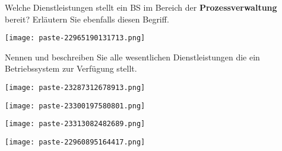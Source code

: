 \documentclass{article}
\begin{document}
\begin{tcolorbox}[colback=white!10!white,colframe=lightgray!75!black,
  savelowerto=\jobname_ex.tex,breakable,enhanced,lines before break=40]

\begin{center}
Welche Dienstleistungen stellt ein BS im Bereich der 
\textbf{Prozessverwaltung
}bereit? Erläutern Sie ebenfalls diesen Begriff.

\end{center}

\tcblower

\justifying
\begin{center}
\texttt{[image: paste-22965190131713.png]}
\end{center}

\end{tcolorbox}
\begin{tcolorbox}[colback=white!10!white,colframe=lightgray!75!black,
  savelowerto=\jobname_ex.tex,breakable,enhanced,lines before break=40]

\begin{center}
Nennen und beschreiben Sie alle wesentlichen Dienstleistungen die ein Betriebssystem zur Verfügung stellt.

\end{center}

\tcblower

\justifying
\begin{center}
\texttt{[image: paste-23287312678913.png]}
\end{center}
\begin{center}
\texttt{[image: paste-23300197580801.png]}
\end{center}
\begin{center}
\texttt{[image: paste-23313082482689.png]}
\end{center}
\begin{center}
\texttt{[image: paste-22960895164417.png]}
\end{center}

\end{tcolorbox}
\end{document}
